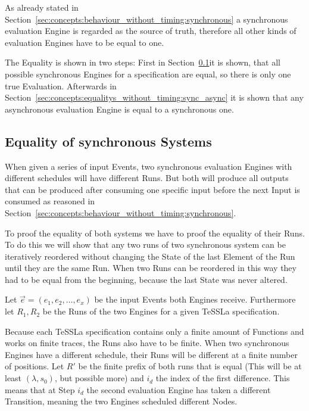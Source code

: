 As already stated in Section~\ref{sec:concepts:behaviour_without_timing:synchronous} a synchronous evaluation Engine is regarded as the source of truth, therefore all other kinds of evaluation Engines have to be equal to one.

The Equality is shown in two steps: First in Section~\ref{sec:concepts:equalitys_without_timing:synchronous}it is shown, that all possible synchronous Engines for a specification are equal, so there is only one true Evaluation.
Afterwards in Section~\ref{sec:concepts:equalitys_without_timing:sync_async} it is shown that any asynchronous evaluation Engine is equal to a synchronous one.

\subsection{Equality of synchronous Systems}
\label{sec:concepts:equalitys_without_timing:synchronous}

When given a series of input Events, two synchronous evaluation Engines with different schedules will have different Runs.
But both will produce all outputs that can be produced after consuming one specific input before the next Input is consumed as reasoned in Section~\ref{sec:concepts:behaviour_without_timing:synchronous}.

To proof the equality of both systems we have to proof the equality of their Runs.
To do this we will show that any two runs of two synchronous system can be iteratively reordered without changing the State of the last Element of the Run until they are the same Run.
When two Runs can be reordered in this way they had to be equal from the beginning, because the last State was never altered.

Let \(\vec{e} = (e_1, e_2, \dots, e_x)\) be the input Events both Engines receive.
Furthermore let \(R_1, R_2\) be the Runs of the two Engines for a given TeSSLa specification.

Because each TeSSLa specification contains only a finite amount of Functions and works on finite traces, the Runs also have to be finite.
When two synchronous Engines have a different schedule, their Runs will be different at a finite number of positions.
Let \(R'\) be the finite prefix of both runs that is equal (This will be at least \((\lambda, s_0)\), but possible more) and \(i_d\) the index of the first difference.
This means that at Step \(i_d\) the second evaluation Engine has taken a different Transition, meaning the two Engines scheduled different Nodes.

